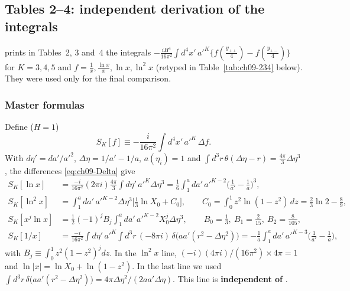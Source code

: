 \subsection{Tables 2--4: independent derivation of the integrals}
\label{sec:t18-tab234}

\PII{} prints in Tables~2, 3 and~4 \tP{} the integrals
$-\frac{iH^4}{16\pi^2}\int d^4x'\,a'^K\{f(\frac{y_{++}}4)-f(\frac{y_{+-}}4)\}$ for $K=3,4,5$ and $f=\frac1x,\frac{\ln x}x,\ln x,\ln^2x$
(retyped in Table~\ref{tab:ch09-234} below). They were used only for the final comparison.

\subsubsection{Master formulas}
Define ($H=1$)
\begin{equation}
S_K[f]\equiv-\frac{i}{16\pi^2}\int d^4x'\,a'^K\,\Delta f .
\label{eq:ch09-SK}
\end{equation}
With $d\eta'=da'/a'^2$, $\Delta\eta=1/a'-1/a$, $a(\eta_i)=1$ and $\int d^3r\,\theta(\Delta\eta-r)=\tfrac{4\pi}3\Delta\eta^3$, the differences \eqref{eq:ch09-Delta} give \tD
\begin{equation}
\begin{aligned}
S_K[\ln x]&=\frac{-i}{16\pi^2}(2\pi i)\frac{4\pi}{3}\int d\eta'\,a'^K\Delta\eta^3=\frac16\int_1^a\!da'\,a'^{K-2}\Big(\frac1{a'}-\frac1a\Big)^3,\\
S_K[\ln^2x]&=\int_1^a\!da'\,a'^{K-2}\Delta\eta^3\Big[\frac13\ln X_0+C_0\Big],\qquad C_0=\int_0^1\!z^2\ln(1-z^2)\,dz=\frac23\ln2-\frac89,\\
S_K[x^j\ln x]&=\frac12(-1)^jB_j\int_1^a\!da'\,a'^{K-2}X_0^j\Delta\eta^3,\qquad B_0=\frac13,\ B_1=\frac2{15},\ B_2=\frac8{105},\\
S_K[1/x]&=\frac{-i}{16\pi^2}\int d\eta'\,a'^K\!\int d^3r\,(-8\pi i)\,\delta\big(aa'(r^2-\Delta\eta^2)\big)=-\frac1a\int_1^a\!da'\,a'^{K-3}\Big(\frac1{a'}-\frac1a\Big),
\end{aligned}
\label{eq:ch09-master}
\end{equation}
with $B_j\equiv\int_0^1z^2(1-z^2)^jdz$. In the $\ln^2x$ line, $(-i)(4\pi i)/(16\pi^2)\times4\pi=1$ and $\ln|x|=\ln X_0+\ln(1-z^2)$.
In the last line we used $\int d^3r\,\delta\big(aa'(r^2-\Delta\eta^2)\big)=4\pi\Delta\eta^2/(2aa'\Delta\eta)$.
This line is \textbf{independent of }.

